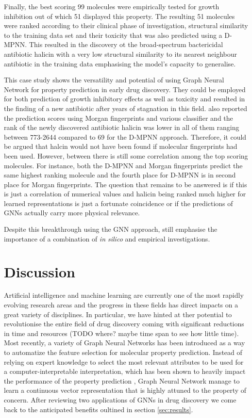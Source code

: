 Finally, the best scoring 99 molecules were empirically tested for growth inhibition out of which 51 displayed this property. The resulting 51 molecules were ranked according to their clinical phase of investigation, structural similarity to the training data set and their toxicity that was also predicted using a D-MPNN. This resulted in the discovery ot the broad-spectrum bactericidal antibiotic halicin with a very low structural similarity to its nearest neighbour antibiotic in the training data emphasising the model's capacity to generalise. 

This case study shows the versatility and potential of using Graph Neural Network for property prediction in early drug discovery. They could be employed for both prediction of growth inhibitory effects as well as toxicity and resulted in the finding of a new antibiotic after years of stagnation in this field. \cite{STOKES2020688} also reported the prediction scores using Morgan fingerprints and various classifier and the rank of the newly discovered antibiotic halicin was lower in all of them ranging between 773-2644 compared to 69 for the D-MPNN approach. Therefore, it could be argued that halcin would not have been found if molecular fingerprints had been used. However, between there is still some correlation among the top scoring molecules. For instance, both the D-MPNN and Morgan fingerprints predict the same highest ranking molecule and the fourth place for D-MPNN is in second place for Morgan fingerprints. The question that remains to be answered is if this is just a correlation of numerical values and halicin being ranked much higher for learned representations is just a fortunate coincidence or if the predictions of GNNs actually carry more physical relevance.

Despite this breakthrough using the GNN approach, \cite{STOKES2020688} still emphasise the importance of a combination of \emph{in silico} and empirical investigations. 

\section{Discussion}
Artificial intelligence and machine learning are currently one of the most rapidly evolving research areas and the progress in these fields has direct impacts on  a great variety of disciplines. In particular, we have hinted at ther potential to revolutionise the entire field of drug discovery coming with significant reductions in time and resources (TODO where? maybe time span to see how little time). Most recently, a variety of Graph Neural Networks has been introduced as a way to automatize the feature selection for molecular property prediction. Instead of relying on expert knowledge to select the most relevant attributes to be used for a computer-interpretable interpretation, which has been shown to heavily impact the performance of the property prediction \citep{tian}, Graph Neural Network manage to learn a continuous vector representation that is highly attuned to the property of concern. After reviewing two applications of GNNs in drug discovery we come back to the anticipated benefits oultined in section \ref{sec:results}. 

